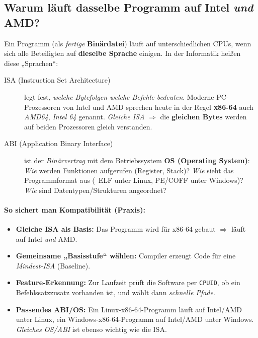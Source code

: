 \documentclass[../skript/main.tex]{subfiles}
\begin{document}
\subsection{Warum läuft dasselbe Programm auf Intel \emph{und} AMD?}\label{sec:isa-kompat}
Ein Programm (als \emph{fertige} \textbf{Binärdatei}) läuft auf unterschiedlichen CPUs, wenn sich alle Beteiligten auf \textbf{dieselbe Sprache} einigen. In der Informatik heißen diese „Sprachen“:

\begin{description}
	\item[ISA (Instruction Set Architecture)] legt fest, \emph{welche Bytefolgen welche Befehle bedeuten}. 
	Moderne PC-Prozessoren von Intel und AMD sprechen heute in der Regel \textbf{x86{-}64} auch \emph{AMD64}, \emph{Intel 64} genannt. 
	\emph{Gleiche ISA} \(\Rightarrow\) die \textbf{gleichen Bytes} werden auf beiden Prozessoren gleich verstanden.
	\item[ABI (Application Binary Interface)] ist der \emph{Binärvertrag} mit dem Betriebssystem \textbf{OS (Operating System)}: 
	\emph{Wie} werden Funktionen aufgerufen (Register, Stack)? 
	\emph{Wie} sieht das Programmformat aus (\ZB\ ELF unter Linux, PE/COFF unter Windows)? 
	\emph{Wie} sind Datentypen/Strukturen angeordnet?
\end{description}

\paragraph{So sichert man Kompatibilität (Praxis):}
\begin{itemize}
	\item \textbf{Gleiche ISA als Basis:} Das Programm wird für x86{-}64 gebaut \(\Rightarrow\) läuft auf Intel \emph{und} AMD.
	\item \textbf{Gemeinsame „Basisstufe“ wählen:} Compiler erzeugt Code für eine \emph{Mindest-ISA} (Baseline).
	\item \textbf{Feature-Erkennung:} Zur Laufzeit prüft die Software per \texttt{CPUID}, ob ein Befehlssatzzusatz vorhanden ist, 
	und wählt dann \emph{schnelle Pfade}.
	\item \textbf{Passendes ABI/OS:} Ein Linux{-}x86{-}64{-}Programm läuft auf Intel/AMD unter Linux, 
	ein Windows{-}x86{-}64{-}Programm auf Intel/AMD unter Windows. 
	\emph{Gleiches OS/ABI} ist ebenso wichtig wie die ISA.
\end{itemize}
\end{document}
